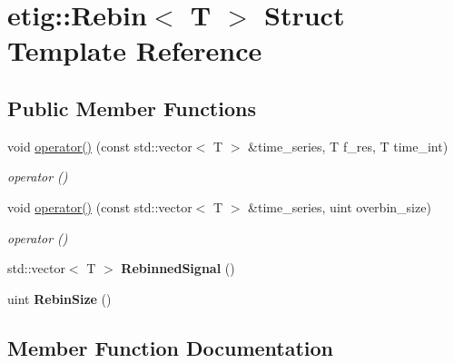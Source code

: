 \hypertarget{structetig_1_1_rebin}{}\section{etig\+:\+:Rebin$<$ T $>$ Struct Template Reference}
\label{structetig_1_1_rebin}
\subsection*{Public Member Functions}
\begin{DoxyCompactItemize}
\item 
void \hyperlink{structetig_1_1_rebin_a35e4d74f8a7246fea553ced3d36dd2e2}{operator()} (const std\+::vector$<$ T $>$ \&time\+\_\+series, T f\+\_\+res, T time\+\_\+int)
\begin{DoxyCompactList}\small\item\em operator () \end{DoxyCompactList}\item 
void \hyperlink{structetig_1_1_rebin_a19fa21958e651977f7d2664bb6f71fd3}{operator()} (const std\+::vector$<$ T $>$ \&time\+\_\+series, uint overbin\+\_\+size)
\begin{DoxyCompactList}\small\item\em operator () \end{DoxyCompactList}\item 
std\+::vector$<$ T $>$ {\bfseries Rebinned\+Signal} ()\hypertarget{structetig_1_1_rebin_afa8fd00980940055279a2c35eba4b43d}{}\label{structetig_1_1_rebin_afa8fd00980940055279a2c35eba4b43d}

\item 
uint {\bfseries Rebin\+Size} ()\hypertarget{structetig_1_1_rebin_a90e8b55c1201f4c958cdf0c46d99e364}{}\label{structetig_1_1_rebin_a90e8b55c1201f4c958cdf0c46d99e364}

\end{DoxyCompactItemize}


\subsection{Member Function Documentation}
